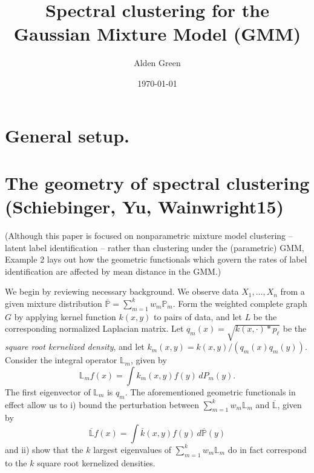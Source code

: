 \documentclass{article}
\newcommand{\1}{\mathbb{I}}
\newcommand{\Pbb}{\mathbb{P}}
\theoremstyle{alden}
\theoremstyle{aldenthm}
\theoremstyle{definition}
\theoremstyle{remark}
\begin{document}
\title{Spectral clustering for the Gaussian Mixture Model (GMM)}
\author{Alden Green}
\date{\today}
\maketitle

\section{General setup.}

\section{The geometry of spectral clustering (Schiebinger, Yu, Wainwright15)}

(Although this paper is focused on nonparametric mixture model clustering -- latent label identification -- rather than clustering under the (parametric) GMM, Example 2 lays out how the geometric functionals which govern the rates of label identification are affected by mean distance in the GMM.)

We begin by reviewing necessary background. We observe data $X_1, \ldots, X_n$ from a given mixture distribution $\overline{\Pbb} = \sum_{m = 1}^{k} w_m \Pbb_m$. Form the weighted complete graph $G$ by applying kernel function $k(x,y)$ to pairs of data, and let $L$ be the corresponding normalized Laplacian matrix. Let $q_m(x) = \sqrt{k(x,\cdot) \ast p_{\ell}}$ be the \emph{square root kernelized density}, and let $k_m(x,y) = k(x,y)/(q_m(x) q_m(y))$. Consider the integral operator $\mathbb{L}_m$, given by
\begin{equation*}
\mathbb{L}_{m}f(x) = \int k_m(x,y) f(y) \,dP_m(y).
\end{equation*}
The first eigenvector of $\mathbb{L}_m$ is $q_m$. The aforementioned geometric functionals in effect allow us to i) bound the perturbation between $\sum_{m = 1}^{k} w_m \mathbb{L}_m$ and $\overline{\mathbb{L}}$, given by
\begin{equation*}
\overline{\mathbb{L}} f(x) = \int \overline{k}(x,y) f(y) \,d\overline{\Pbb}(y) 
\end{equation*}
and ii) show that the $k$ largest eigenvalues of $\sum_{m = 1}^{k} w_m \mathbb{L}_m$ do in fact correspond to the $k$ square root kernelized densities.
\end{document}
